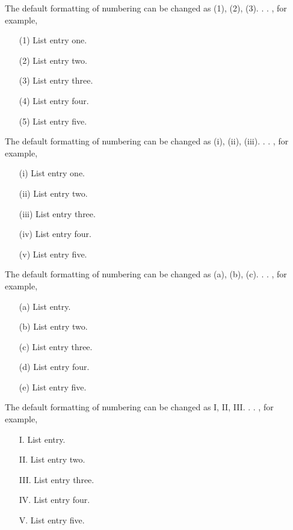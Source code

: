 \documentclass{jpp}
\begin{document}
The default formatting of numbering can be changed as (1), (2), (3). . . , for example,

\begin{enumerate}[(5)]
\item[(1)] List entry one.
\item[(2)] List entry two.
\item[(3)] List entry three.
\item[(4)] List entry four.
\item[(5)] List entry five.
\end{enumerate}

The default formatting of numbering can be changed as (i), (ii), (iii). . . , for example,

\begin{enumerate}[(iii)]
\item[(i)] List entry one.
\item[(ii)] List entry two.
\item[(iii)] List entry three.
\item[(iv)] List entry four.
\item[(v)] List entry five.
\end{enumerate}

The default formatting of numbering can be changed as (a), (b), (c). . . , for example,

\begin{enumerate}[(e)]
\item[(a)] List entry.
\item[(b)] List entry two.
\item[(c)] List entry three.
\item[(d)] List entry four.
\item[(e)] List entry five.
\end{enumerate}


The default formatting of numbering can be changed as I, II, III. . . , for example,

\begin{enumerate}[III.]
\item[I.] List entry.
\item[II.] List entry two.
\item[III.] List entry three.
\item[IV.] List entry four.
\item[V.] List entry five.
\end{enumerate}
\end{document}
